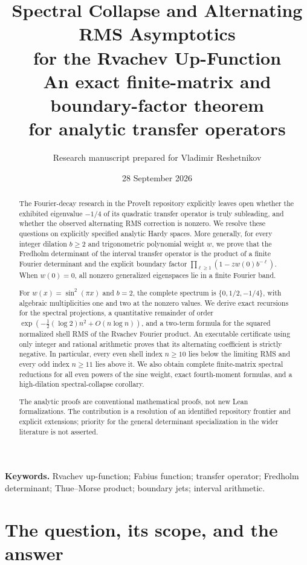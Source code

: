 \documentclass[11pt,a4paper]{article}
\title{\textbf{Spectral Collapse and Alternating RMS Asymptotics\\
for the Rvachev Up-Function}\\[0.6em]
\large An exact finite-matrix and boundary-factor theorem\\
for analytic transfer operators}
\author{Research manuscript prepared for Vladimir Reshetnikov}
\date{28 September 2026}
\theoremstyle{definition}
\theoremstyle{remark}
\numberwithin{equation}{section}
\begin{document}
\maketitle
\begin{abstract}
The Fourier-decay research in the ProveIt repository explicitly leaves open
whether the exhibited eigenvalue $-1/4$ of its quadratic transfer operator is
truly subleading, and whether the observed alternating RMS correction is
nonzero. We resolve these questions on explicitly specified analytic Hardy
spaces. More generally, for every integer dilation $b\ge2$ and trigonometric
polynomial weight $w$, we prove that the Fredholm determinant of the interval
transfer operator is the product of a finite Fourier determinant and the
explicit boundary factor $\prod_{\ell\ge1}(1-zw(0)b^{-\ell})$. When $w(0)=0$,
all nonzero generalized eigenspaces lie in a finite Fourier band.

For $w(x)=\sin^2(\pi x)$ and $b=2$, the complete spectrum is
$\{0,1/2,-1/4\}$, with algebraic multiplicities one and two at the nonzero
values. We derive exact recursions for the spectral projections, a quantitative
remainder of order $\exp(-\tfrac12(\log2)n^2+O(n\log n))$, and a two-term
formula for the squared normalized shell RMS of the Rvachev Fourier product.
An executable certificate using only integer and rational arithmetic proves
that its alternating coefficient is strictly negative. In particular, every
even shell index $n\ge10$ lies below the limiting RMS and every odd index
$n\ge11$ lies above it. We also obtain complete finite-matrix spectral
reductions for all even powers of the sine weight, exact fourth-moment
formulas, and a high-dilation spectral-collapse corollary.

The analytic proofs are conventional mathematical proofs, not new Lean
formalizations. The contribution is a resolution of an identified repository
frontier and explicit extensions; priority for the general determinant
specialization in the wider literature is not asserted.
\end{abstract}
\noindent\textbf{Keywords.} Rvachev up-function; Fabius function; transfer operator;
Fredholm determinant; Thue--Morse product; boundary jets; interval arithmetic.

\clearpage
{\small\setlength{\parskip}{0pt}\tableofcontents}
\clearpage

\section{The question, its scope, and the answer}
\label{sec:intro}
\end{document}
